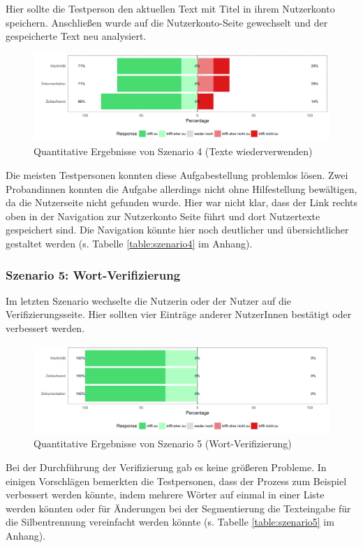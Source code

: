 Hier sollte die Testperson den aktuellen Text mit Titel in ihrem Nutzerkonto speichern. Anschließen wurde auf die Nutzerkonto-Seite gewechselt und der gespeicherte Text neu analysiert.

\begin{figure}[h!]
	\centering
	\includegraphics[width=.8\linewidth]{figures/evaluation/scenario4}
	\caption{Quantitative Ergebnisse von Szenario 4 (Texte wiederverwenden)}
	\label{fig:evaluation-sc4}
\end{figure}

Die meisten Testpersonen konnten diese Aufgabestellung problemlos lösen. Zwei Probandinnen konnten die Aufgabe allerdings nicht ohne Hilfestellung bewältigen, da die Nutzerseite nicht gefunden wurde. Hier war nicht klar, dass der Link rechts oben in der Navigation zur Nutzerkonto Seite führt und dort Nutzertexte gespeichert sind. Die Navigation könnte hier noch deutlicher und übersichtlicher gestaltet werden (s. Tabelle \ref{table:szenario4} im Anhang).

\subsubsection{Szenario 5: Wort-Verifizierung}

Im letzten Szenario wechselte die Nutzerin oder der Nutzer auf die Verifizierungsseite. Hier sollten vier Einträge anderer NutzerInnen bestätigt oder verbessert werden.

\begin{figure}[h!]
	\centering
	\includegraphics[width=.8\linewidth]{figures/evaluation/scenario5}
	\caption{Quantitative Ergebnisse von Szenario 5 (Wort-Verifizierung)}
	\label{fig:evaluation-sc5}
\end{figure}

Bei der Durchführung der Verifizierung gab es keine größeren Probleme. In einigen Vorschlägen bemerkten die Testpersonen, dass der Prozess zum Beispiel verbessert werden könnte, indem mehrere Wörter auf einmal in einer Liste  werden könnten oder für Änderungen bei der Segmentierung die Texteingabe für die Silbentrennung vereinfacht werden könnte (s. Tabelle \ref{table:szenario5} im Anhang).

